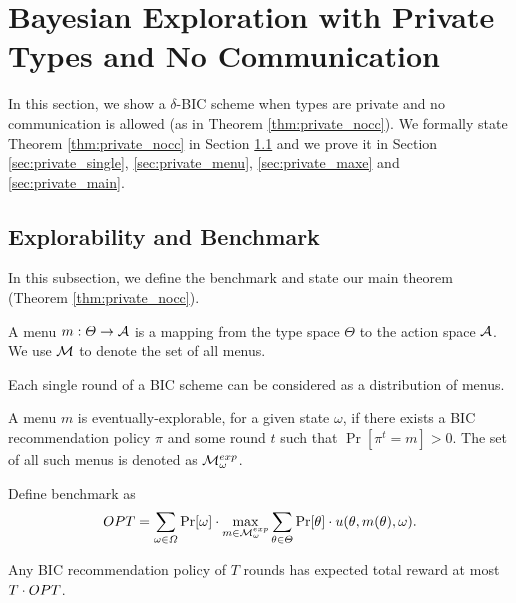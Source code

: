 
\section{Bayesian Exploration with Private Types and No Communication}

In this section, we show a $\delta$-BIC scheme when types are private and no communication is allowed (as in Theorem \ref{thm:private_nocc}). We formally state Theorem \ref{thm:private_nocc} in Section \ref{sec:private_bench} and we prove it in Section \ref{sec:private_single}, \ref{sec:private_menu}, \ref{sec:private_maxe} and \ref{sec:private_main}.

\subsection{Explorability and Benchmark}
\label{sec:private_bench}
In this subsection, we define the benchmark and state our main theorem (Theorem \ref{thm:private_nocc}). 

\begin{definition}
A menu $m: \varTheta \rightarrow \mathcal{A}$ is a mapping from the type space $\varTheta$ to the action space $\mathcal{A}$. We use $\mathcal{M}$ to denote the set of all menus.
\end{definition}

\begin{claim}
Each single round of a BIC scheme can be considered as a distribution of menus.
\end{claim}

\begin{definition}
A menu $m$ is eventually-explorable, for a given state $\omega$, if there exists a BIC recommendation policy $\pi$ and some round $t$ such that $\Pr[\pi^t= m]> 0$. The set of all such menus is denoted as $\mathcal{M}_{\omega}^{exp}$.
\end{definition}

\begin{definition}[Benchmark]
Define benchmark as 
\[
OPT = \sum_{\omega\in \varOmega} \Pr[\omega] \cdot\max_{m \in \mathcal{M}_{\omega}^{exp}}\sum_{\theta \in \varTheta} \Pr[\theta] \cdot  u(\theta, m(\theta), \omega).
\]
\end{definition}

\begin{claim}
Any BIC recommendation policy of $T$ rounds has expected total reward at most $T \cdot OPT$.  
\end{claim}


